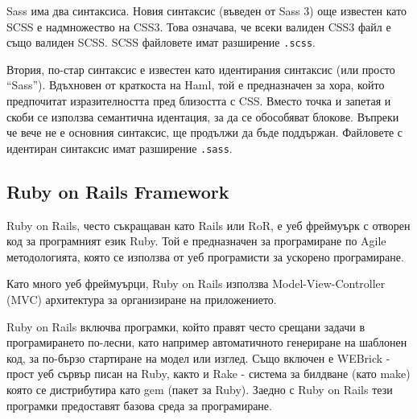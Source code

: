 \documentclass[a4paper]{article}
\begin{document}
  Sass има два синтаксиса. Новия синтаксис (въведен от Sass 3) още известен като SCSS е надмножество на CSS3. Това означава, че всеки валиден CSS3 файл е също валиден SCSS. SCSS файловете имат разширение \texttt{.scss}.


  Втория, по-стар синтаксис е известен като идентирания синтаксис (или просто ``Sass''). Вдъхновен от краткоста на Haml, той е предназначен за хора, който предпочитат изразителността пред близостта с CSS. Вместо точка и запетая и скоби се използва семантична идентация, за да се обособяват блокове. Въпреки че вече не е основния синтаксис, ще продължи да бъде поддържан. Файловете с идентиран синтаксис имат разширение \texttt{.sass}.

  \subsection{Ruby on Rails Framework}
  Ruby on Rails, често съкращаван като Rails или RoR, е уеб фреймуърк с отворен код за програмният език Ruby. Той е предназначен за програмиране по Agile методологията, която се използва от уеб програмисти за ускорено програмиране.

  Като много уеб фреймуърци, Ruby on Rails използва Model-View-Controller (MVC) архитектура за организиране на приложението.

  Ruby on Rails включва програмки, който правят често срещани задачи в програмирането по-лесни, като например автоматичното генериране на шаблонен код, за по-бързо стартиране на модел или изглед. Също включен е WEBrick - прост уеб сървър писан на Ruby, както и Rake - система за билдване (като make) която се дистрибутира като gem (пакет за Ruby). Заедно с Ruby on Rails тези програмки предоставят базова среда за програмиране.
\end{document}
